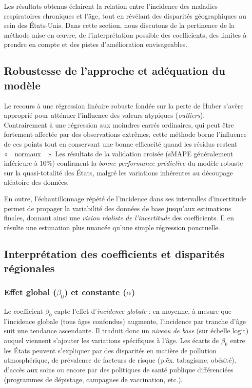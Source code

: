 Les résultats obtenus éclairent la relation entre l'incidence des maladies respiratoires chroniques et l'âge, tout en révélant des disparités géographiques au sein des États-Unis. Dans cette section, nous discutons de la pertinence de la méthode mise en œuvre, de l'interprétation possible des coefficients, des limites à prendre en compte et des pistes d'amélioration envisageables.

\subsection{Robustesse de l'approche et adéquation du modèle}

Le recours à une régression linéaire robuste fondée sur la perte de Huber s’avère approprié pour atténuer l’influence des valeurs atypiques (\emph{outliers}). Contrairement à une régression aux moindres carrés ordinaires, qui peut être fortement affectée par des observations extrêmes, cette méthode borne l’influence de ces points tout en conservant une bonne efficacité quand les résidus restent «~~normaux~~». Les résultats de la validation croisée (sMAPE généralement inférieure à 10\%) confirment la \emph{bonne performance prédictive} du modèle robuste sur la quasi-totalité des États, malgré les variations inhérentes au découpage aléatoire des données.

En outre, l’échantillonnage répété de l’incidence dans ses intervalles d’incertitude permet de propager la variabilité des données de base jusqu’aux estimations finales, donnant ainsi une \emph{vision réaliste de l’incertitude} des coefficients. Il en résulte une estimation plus nuancée qu’une simple régression ponctuelle.

\subsection{Interprétation des coefficients et disparités régionales}

\subsubsection*{Effet global (\texorpdfstring{$\beta_0$}{β0}) et constante (\texorpdfstring{$\alpha$}{α})}

Le coefficient $\beta_0$ capte l’effet d’\emph{incidence globale} : en moyenne, à mesure que l’incidence globale (tous âges confondus) augmente, l’incidence par tranche d’âge suit une tendance ascendante. Il traduit donc un \emph{niveau de base} (sur échelle logit) auquel viennent s’ajouter les variations spécifiques à l’âge. Les écarts de $\beta_0$ entre les États peuvent s’expliquer par des disparités en matière de pollution atmosphérique, de prévalence de facteurs de risque (p.\~ex. tabagisme, obésité), d’accès aux soins ou encore par des politiques de santé publique différenciées (programmes de dépistage, campagnes de vaccination, etc.).

